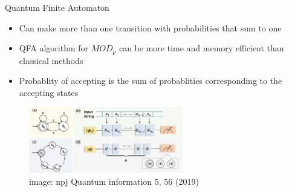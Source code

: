 \documentclass[aspectratio=169,9pt]{beamer}
\begin{document}
\begin{frame}[t]{Quantum Finite Automaton}
  \begin{itemize}
    \item Can make more than one transition with probabilities that sum to one
    \item QFA algorithm for $MOD_p$ can be more time and memory efficient than classical methods
    \item Probablity of accepting is the sum of probablities corresponding to the accepting states
  \end{itemize}
  \begin{figure}
    \includegraphics[width=0.6\textwidth]{DFA.png}
    \caption*{image: npj Quantum information 5, 56 (2019)}
  \end{figure}
\end{frame}


\end{document}
